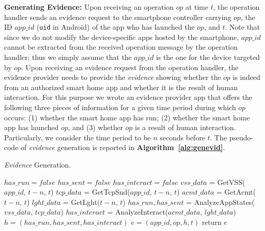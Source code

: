 \documentclass[letterpaper,12pt]{article}
\begin{document}
\textbf{Generating Evidence:} 
Upon receiving an operation $op$ at time $t$, the operation handler sends an evidence request to the smartphone controller carrying $op$, the ID $app\_id$ (\texttt{uid} in Android) of the app who has launched the $op$, and $t$. Note that since we do not modify the device-specific apps hosted by the smartphone, $app\_id$ cannot be extracted from the received operation message by the operation handler; thus we simply assume that the $app\_id$ is the one for the device targeted by $op$. %
Upon receiving an evidence request from the operation handler, the evidence provider needs to provide the \textit{evidence} showing whether the $op$ is indeed from an authorized smart home app and whether it is the result of human interaction. For this purpose we wrote an %
evidence provider app that offers the following three pieces of information for a given  time period during which $op$ occurs: (1) whether the smart home app has run; (2) whether the smart home app has launched  $op$, and (3) whether $op$ is a result of human interaction. Particularly, we consider the time period to be $n$ seconds before $t$. %
The pseudo-code of \textit{evidence} generation is reported in {\bf Algorithm~\ref{alg:genevid}}.

\begin{algorithm}[!htb]
\caption{\textit{Evidence} Generation.}%
\label{alg:genevid}
\begin{algorithmic}[1]
\State $has\_run = false$
\State $has\_sent=false$
\State $has\_interact=false$
\State $vss\_data$ = GetVSS($app\_id$, $t-n$, $t$)
\State $tcp\_data$ = GetTcpSnd($app\_id$, $t-n$, $t$)
\State $acmt\_data$ = GetAcmt($t-n$, $t$)
\State $lght\_data$ = GetLght($t-n$, $t$)
\State $has\_run,has\_sent$ = AnalyzeAppStates($vss\_data$, $tcp\_data$)
\State $has\_interact$ = AnalyzeInteract($acmt\_data$, $lght\_data$)
\State $h=(has\_run,has\_sent,has\_interact)$
\State $e=(app\_id,op, h, t)$
\State return $e$
\EndProcedure
\end{algorithmic}
\end{algorithm}
\end{document}
